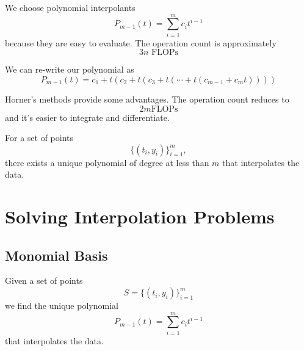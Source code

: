 \begin{note}
    We choose polynomial interpolants \[
        P_{m-1}(t) = \sum_{i=1}^m c_i t^{i-1}
    \] because they are easy to evaluate. The operation count is approximately \[
        3n \text{ FLOPs}
    \]
\end{note}

\begin{theorem}
    We can re-write our polynomial as \[
        P_{m-1}(t) = c_1 + t(c_2 + t(c_3 + t(\cdots + t(c_{m-1} + c_m t))))
    \]
\end{theorem}

\begin{note}
    Horner's methods provide some advantages. The operation count reduces to \[
        2m \text{FLOPs}
    \] and it's easier to integrate and differentiate.
\end{note}

\begin{theorem}
    For a set of points \[
        \{ (t_i, y_i) \}_{i=1}^m,
    \] there exists a unique polynomial of degree at less than \( m \) that interpolates the data.
\end{theorem}

\section{Solving Interpolation Problems}

\subsection{Monomial Basis}

Given a set of points \[
    S = \{ (t_i, y_i) \}_{i=1}^m
\] we find the unique polynomial \[
    P_{m-1}(t) = \sum_{i=1}^{m} c_i t^{i-1}
\] that interpolates the data.

